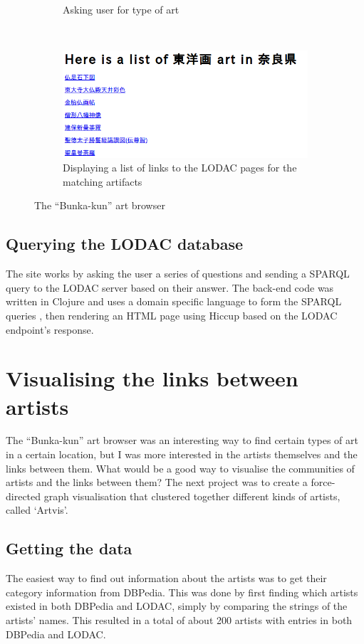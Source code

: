 \documentclass[11pt]{article}
\begin{document}
\begin{figure}
\begin{subfigure}[b]{0.4\textwidth}
    \caption{Asking user for type of art} \label{fig:bunka2}
  \end{subfigure}\
  \vspace{10mm}
  \begin{subfigure}[b]{0.5\textwidth}
    \includegraphics[width=\textwidth]{bunka3.png}
    \caption{Displaying a list of links to the LODAC pages for the matching artifacts}
    \label{fig:bunka3} 
  \end{subfigure}
\caption{The ``Bunka-kun'' art browser}
\label{fig:bunka} 
\end{figure}

\subsection{Querying the LODAC database} The site works by asking the user a series of questions and sending a SPARQL query to the LODAC server based on their answer.  The back-end code was written in Clojure \cite{clojure} and uses a domain specific language to form the SPARQL queries \cite{matz}, then rendering an HTML page using Hiccup \cite{hiccup} based on the LODAC endpoint's response.  

\section{Visualising the links between artists} The ``Bunka-kun'' art browser was an interesting way to find certain types of art in a certain location, but I was more interested in the artists themselves and the links between them. What would be a good way to visualise the communities of artists and the links between them? The next project was to create a force-directed graph visualisation that clustered together different kinds of artists, called `Artvis'.  

\subsection{Getting the data} The easiest way to find out information about the artists was to get their category information from DBPedia. This was done by first finding which artists existed in both DBPedia and LODAC, simply by comparing the strings of the artists' names. This resulted in a total of about 200 artists with entries in both DBPedia and LODAC. 
\end{document}
